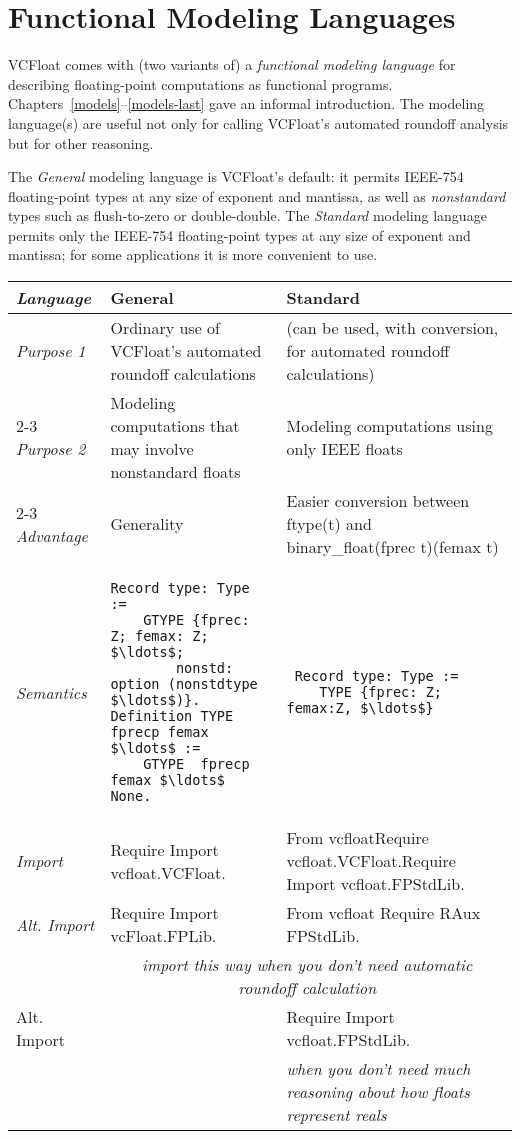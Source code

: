 \documentclass[article]{memoir}
\begin{document}
\chapter{Functional Modeling Languages}
\label{modeling}

VCFloat comes with (two variants of) a \emph{functional modeling language} for describing floating-point computations as functional programs.
Chapters~\ref{models}--\ref{models-last} gave an informal introduction.   The modeling language(s) are useful not only for
calling VCFloat's automated roundoff analysis but for other reasoning.

The \emph{General} modeling language is VCFloat's default: it permits IEEE-754 floating-point types at any size of exponent and mantissa, as well as \emph{nonstandard} types such as flush-to-zero or double-double.  The \emph{Standard} modeling language permits only the IEEE-754 floating-point types at any size of exponent and mantissa; for some applications it is more convenient to use.

\vfill
\noindent\begin{tabular}{@{}l | p{2.4in}| p{2.4in} |@{}}
\emph{Language} & \textbf{General} & \textbf{Standard} \\ \hline
\emph{Purpose 1} & Ordinary use of VCFloat's automated roundoff calculations & (can be used, with conversion, for automated roundoff calculations) \\ \cline{2-3}
\emph{Purpose 2} & Modeling computations that may involve nonstandard floats & Modeling computations using only IEEE floats \\ \cline{2-3}
\emph{Advantage} & Generality & Easier conversion between \textsf{ftype(t)} and \textsf{binary\_float(fprec t)(femax t)} \\ \hline
\emph{Semantics}
& \begin{lstlisting}
Record type: Type :=  
    GTYPE {fprec: Z; femax: Z; $\ldots$; 
        nonstd: option (nonstdtype $\ldots$)}.
Definition TYPE fprecp femax $\ldots$ :=
    GTYPE  fprecp femax $\ldots$ None.
\end{lstlisting}
& \begin{lstlisting}
 Record type: Type :=
    TYPE {fprec: Z; femax:Z, $\ldots$}
\end{lstlisting} \\
\hline
\emph{Import} & \textsf{Require Import vcfloat.VCFloat.} & \textsf{From vcfloat\newline Require vcfloat.VCFloat.\newline Require Import vcfloat.FPStdLib.} \\ \hline
\emph{Alt. Import} & \textsf{Require Import vcFloat.FPLib.} & \textsf{From vcfloat Require RAux FPStdLib.} \\
& \multicolumn{2}{c|}{\emph{import this way when you don't need automatic roundoff calculation }} \\  \hline
Alt. Import & & \textsf{Require Import vcfloat.FPStdLib.} \\
&  & \emph{when you don't need much reasoning about how floats represent reals} \\
\hline
\end{tabular}
\vfill
\end{document}
